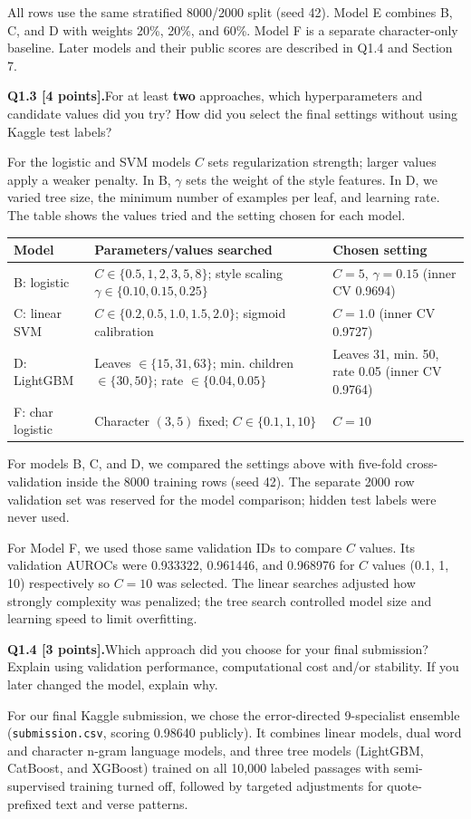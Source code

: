 \documentclass[11pt,letterpaper]{article}
\newcommand{\question}[2]{\needspace{4\baselineskip}\par\addvspace{0.45em}\noindent\textbf{#1}\quad #2\par\nobreak\vspace{0.1em}}
\begin{document}
All rows use the same stratified 8000/2000 split (seed 42). Model E combines B, C, and D with weights 20\%, 20\%, and 60\%. Model F is a separate character-only baseline. Later models and their public scores are described in Q1.4 and Section 7.
\question{Q1.3 [4 points].}{For at least \textbf{two} approaches, which hyperparameters and candidate values did you try? How did you select the final settings without using Kaggle test labels?}
For the logistic and SVM models $C$ sets regularization strength; larger values apply a weaker penalty. In B, $\gamma$ sets the weight of the style features. In D, we varied tree size, the minimum number of examples per leaf, and learning rate. The table shows the values tried and the setting chosen for each model.
\begin{tabularx}{\linewidth}{@{}p{1.18in}Yp{1.38in}@{}}\toprule Model & Parameters/values searched & Chosen setting \\ \midrule
B: logistic & $C\in\{0.5,1,2,3,5,8\}$; style scaling $\gamma\in\{0.10,0.15,0.25\}$ & $C=5$, $\gamma=0.15$ (inner CV 0.9694) \\
C: linear SVM & $C\in\{0.2,0.5,1.0,1.5,2.0\}$; sigmoid calibration & $C=1.0$ (inner CV 0.9727) \\
D: LightGBM & Leaves $\in\{15,31,63\}$; min. children $\in\{30,50\}$; rate $\in\{0.04,0.05\}$ & Leaves 31, min. 50, rate 0.05 (inner CV 0.9764) \\
F: char logistic & Character $(3,5)$ fixed; $C\in\{0.1,1,10\}$ & $C=10$ \\
\bottomrule\end{tabularx}

For models B, C, and D, we compared the settings above with five-fold cross-validation inside the 8000 training rows (seed 42). The separate 2000 row validation set was reserved for the model comparison; hidden test labels were never used.

For Model F, we used those same validation IDs to compare $C$ values. Its validation AUROCs were 0.933322, 0.961446, and 0.968976 for $C$ values (0.1, 1, 10) respectively so $C=10$ was selected. The linear searches adjusted how strongly complexity was penalized; the tree search controlled model size and learning speed to limit overfitting.
\question{Q1.4 [3 points].}{Which approach did you choose for your final submission? Explain using validation performance, computational cost and/or stability. If you later changed the model, explain why.}
For our final Kaggle submission, we chose the error-directed 9-specialist ensemble (\texttt{submission.csv}, scoring 0.98640 publicly). It combines linear models, dual word and character n-gram language models, and three tree models (LightGBM, CatBoost, and XGBoost) trained on all 10,000 labeled passages with semi-supervised training turned off, followed by targeted adjustments for quote-prefixed text and verse patterns.
\end{document}
